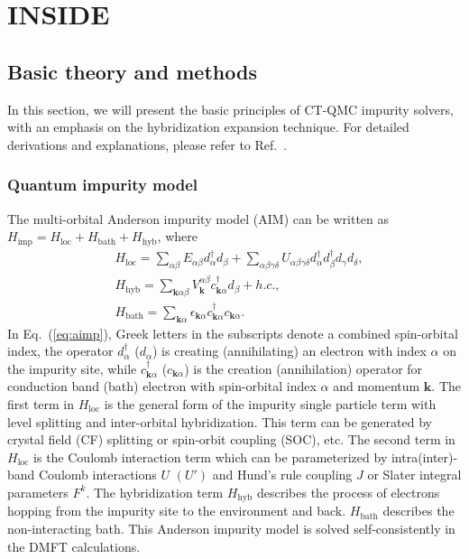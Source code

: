 \chapter{INSIDE {\iqist}}
\section{Basic theory and methods}

In this section, we will present the basic principles of CT-QMC impurity solvers, with an emphasis on the hybridization expansion technique. For detailed derivations and explanations, please refer to Ref.~\cite{RevModPhys.83.349}.

\subsection{Quantum impurity model}

The multi-orbital Anderson impurity model (AIM) can be written as $H_{\text{imp}} = H_{\text{loc}} + H_{\text{bath}} + H_{\text{hyb}}$, where
\begin{subequations}
\label{eq:aimp}
\begin{align}
& H_{\text{loc}} = \sum_{\alpha\beta} E_{\alpha\beta} d_{\alpha}^{\dagger} d_{\beta}+\sum_{\alpha\beta\gamma\delta} U_{\alpha\beta\gamma\delta} 
    d^{\dagger}_{\alpha}d^{\dagger}_{\beta} d_{\gamma} d_{\delta}, \\
& H_{\text{hyb} } = \sum_{\textbf{k}\alpha\beta} V^{\alpha\beta}_{\textbf{k}} c_{\textbf{k}\alpha}^{\dagger} d_{\beta} + h.c., \\
& H_{\text{bath}} = \sum_{\textbf{k}\alpha} \epsilon_{\textbf{k}\alpha} c_{\textbf{k}\alpha}^{\dagger} c_{\textbf{k}\alpha}.
\end{align}
\end{subequations}
In Eq.~(\ref{eq:aimp}), Greek letters in the subscripts denote a combined spin-orbital index, the operator $d_\alpha^{\dagger}$ ($d_\alpha$) is creating (annihilating) an electron with index $\alpha$ on the impurity site, while $c_{\textbf{k}\alpha}^{\dagger}$ ($c_{\textbf{k}\alpha}$) is the creation (annihilation) operator for conduction band (bath) electron with spin-orbital index $\alpha$ and momentum $\textbf{k}$. The first term in $H_{\text{loc}}$ is the general form of the impurity single particle term with level splitting and inter-orbital hybridization. This term can be generated by crystal field (CF) splitting or spin-orbit coupling (SOC), etc. The second term in $H_{\text{loc}}$ is the Coulomb interaction term which can be parameterized by intra(inter)-band Coulomb interactions $U$ $(U')$ and Hund's rule coupling $J$ or Slater integral parameters $F^{k}$. The hybridization term $H_{\text{hyb}}$ describes the process of electrons hopping from the impurity site to the environment and back. $H_{\text{bath}}$ describes the non-interacting bath. This Anderson impurity model is solved self-consistently in the DMFT calculations.

